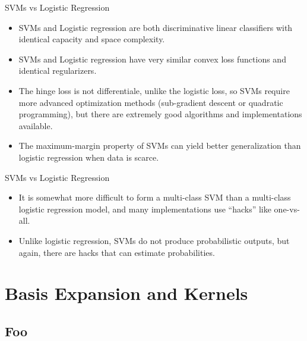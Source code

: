 \documentclass[serif,xcolor=pdftex,dvipsnames,table,hyperref={bookmarks=false}]{beamer}
\begin{document}
\begin{frame}[t]{SVMs vs Logistic Regression}

\begin{itemize}
\setlength{\itemsep}{8pt}
\item SVMs and Logistic regression are both discriminative linear classifiers with identical capacity and space complexity. 

\pause\item SVMs and Logistic regression have very similar convex loss functions and identical regularizers.

\pause\item The hinge loss is not differentiale, unlike the logistic loss, so SVMs require more advanced optimization methods (sub-gradient descent or quadratic programming), but there are extremely good algorithms and implementations available.

\pause \item The maximum-margin property of SVMs can yield better generalization than logistic regression when data is scarce.

\end{itemize}
\end{frame}

\begin{frame}[t]{SVMs vs Logistic Regression}

\begin{itemize}
\setlength{\itemsep}{8pt}

\item It is somewhat more difficult to form a multi-class SVM than a multi-class logistic regression model, and many implementations use ``hacks'' like one-vs-all.

\pause \item Unlike logistic regression, SVMs do not produce probabilistic outputs, but again, there are hacks that can estimate probabilities.

\end{itemize}
\end{frame}

\section{Basis Expansion and Kernels}
\subsection{Foo}
\end{document}
